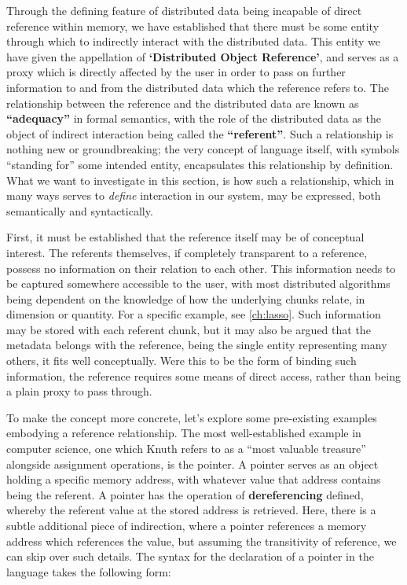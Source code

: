 Through the defining feature of distributed data being incapable of direct reference within memory, we have established that there must be some entity through which to indirectly interact with the distributed data.
This entity we have given the appellation of \textbf{`Distributed Object Reference'}, and serves as a proxy which is directly affected by the user in order to pass on further information to and from the distributed data which the reference refers to.
The relationship between the reference and the distributed data are known as \textbf{``adequacy''} in formal semantics, with the role of the distributed data as the object of indirect interaction being called the \textbf{``referent''}.
Such a relationship is nothing new or groundbreaking; the very concept of language itself, with symbols ``standing for'' some intended entity, encapsulates this relationship by definition.
What we want to investigate in this section, is how such a relationship, which in many ways serves to \emph{define} interaction in our system, may be expressed, both semantically and syntactically.

First, it must be established that the reference itself may be of conceptual interest.
The referents themselves, if completely transparent to a reference, possess no information on their relation to each other.
This information needs to be captured somewhere accessible to the user, with most distributed algorithms being dependent on the knowledge of how the underlying chunks relate, in dimension or quantity.
For a specific example, see \cref{ch:lasso}.
Such information may be stored with each referent chunk, but it may also be argued that the metadata belongs with the reference, being the single entity representing many others, it fits well conceptually.
Were this to be the form of binding such information, the reference requires some means of direct access, rather than being a plain proxy to pass through.

To make the concept more concrete, let's explore some pre-existing examples embodying a reference relationship.
The most well-established example in computer science, one which Knuth refers to as a ``most valuable treasure'' alongside assignment operations, is the pointer.
A pointer serves as an object holding a specific memory address, with whatever value that address contains being the referent.
A pointer has the operation of \textbf{dereferencing} defined, whereby the referent value at the stored address is retrieved.
Here, there is a subtle additional piece of indirection, where a pointer references a memory address which references the value, but assuming the transitivity of reference, we can skip over such details.
The syntax for the declaration of a pointer in the  language takes the following form:

